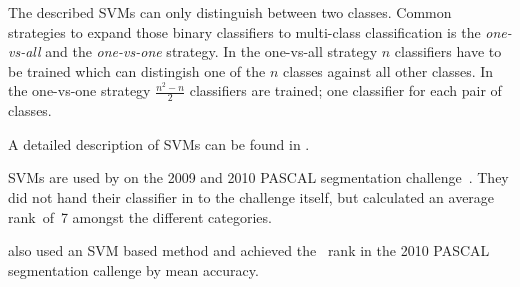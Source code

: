 The described \glspl{SVM} can only distinguish between two classes. Common
strategies to expand those binary classifiers to multi-class classification is
the \textit{one-vs-all} and the \textit{one-vs-one} strategy. In the one-vs-all
strategy $n$ classifiers have to be trained which can distingish one of the $n$
classes against all other classes. In the one-vs-one strategy $\frac{n^2 - n}{2}$
classifiers are trained; one classifier for each pair of classes.

A detailed description of \glspl{SVM} can be found in \cite{burges1998tutorial}.

\Glspl{SVM} are used by \cite{yang2012layered} on the 2009 and 2010 PASCAL
segmentation challenge~\cite{everingham2010pascal}. They did not hand their
classifier in to the challenge itself, but calculated an average rank~of~7
amongst the different categories.

\cite{felzenszwalb2010object} also used an SVM based method and achieved the
~rank in the 2010 PASCAL segmentation callenge by mean accuracy.